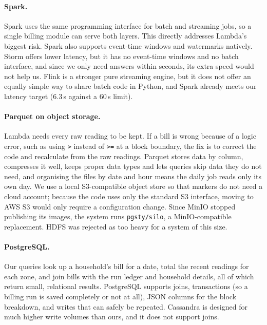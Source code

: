 \documentclass[11pt,a4paper]{article}
\begin{document}
\paragraph{Spark.} Spark \cite{spark} uses the same programming interface for batch and
streaming jobs, so a single billing module can serve both layers. This directly addresses
Lambda's biggest risk. Spark also supports event-time windows and watermarks natively. Storm
offers lower latency, but it has no event-time windows and no batch interface, and since we
only need answers within seconds, its extra speed would not help us. Flink is a stronger pure
streaming engine, but it does not offer an equally simple way to share batch code in Python,
and Spark already meets our latency target (6.3\,s against a 60\,s limit).

\paragraph{Parquet on object storage.} Lambda needs every raw reading to be kept. If a bill
is wrong because of a logic error, such as using \texttt{>} instead of \texttt{>=} at a
block boundary, the fix is to correct the code and recalculate from the raw readings.
Parquet stores data by column, compresses it well, keeps proper data types and lets queries
skip data they do not need, and organising the files by date and hour means the daily job
reads only its own day. We use a local S3-compatible object store so that markers do not
need a cloud account; because the code uses only the standard S3 interface, moving to AWS S3
would only require a configuration change. Since MinIO stopped publishing its images, the
system runs \texttt{pgsty/silo}, a MinIO-compatible replacement. HDFS was rejected as too
heavy for a system of this size.

\paragraph{PostgreSQL.} Our queries look up a household's bill for a date, total the recent
readings for each zone, and join bills with the run ledger and household details, all of
which return small, relational results. PostgreSQL supports joins, transactions (so a billing
run is saved completely or not at all), JSON columns for the block breakdown, and writes that
can safely be repeated. Cassandra is designed for much higher write volumes than ours, and it
does not support joins.
\end{document}
